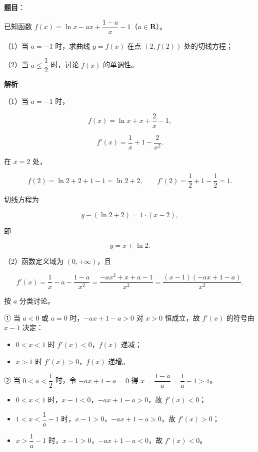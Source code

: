 \begin{answer}

\textbf{题目}：

已知函数 $f(x)=\ln x-ax+\dfrac{1-a}{x}-1$（$a\in\mathbf R$）。

（1）当 $a=-1$ 时，求曲线 $y=f(x)$ 在点 $(2,f(2))$ 处的切线方程；

（2）当 $a\leqslant\dfrac12$ 时，讨论 $f(x)$ 的单调性。

\textbf{解析}

（1）当 $a=-1$ 时，

\nopagebreak[4]
\[f(x)=\ln x+x+\frac2x-1,\]

\nopagebreak[4]
\[f'(x)=\frac1x+1-\frac2{x^2}.\]

在 $x=2$ 处，

\nopagebreak[4]
\[f(2)=\ln2+2+1-1=\ln2+2,\qquad f'(2)=\frac12+1-\frac12=1.\]

切线方程为

\nopagebreak[4]
\[y-(\ln2+2)=1\cdot(x-2),\]

即

\nopagebreak[4]
\[y=x+\ln2.\]

（2）函数定义域为 $(0,+\infty)$，且

\nopagebreak[4]
\[f'(x)=\frac1x-a-\frac{1-a}{x^2}
=\frac{-ax^2+x+a-1}{x^2}
=\frac{(x-1)(-ax+1-a)}{x^2}.\]

按 $a$ 分类讨论。

① 当 $a<0$ 或 $a=0$ 时，$-ax+1-a>0$ 对 $x>0$ 恒成立，故 $f'(x)$ 的符号由 $x-1$ 决定：

\begin{itemize}
\item $0<x<1$ 时 $f'(x)<0$，$f(x)$ 递减；
\item $x>1$ 时 $f'(x)>0$，$f(x)$ 递增。
\end{itemize}

② 当 $0<a<\dfrac12$ 时，令 $-ax+1-a=0$ 得 $x=\dfrac{1-a}{a}=\dfrac1a-1>1$。

\begin{itemize}
\item $0<x<1$ 时，$x-1<0$，$-ax+1-a>0$，故 $f'(x)<0$；
\item $1<x<\dfrac1a-1$ 时，$x-1>0$，$-ax+1-a>0$，故 $f'(x)>0$；
\item $x>\dfrac1a-1$ 时，$x-1>0$，$-ax+1-a<0$，故 $f'(x)<0$。
\end{itemize}


\end{answer}
